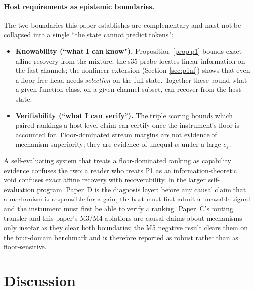 \documentclass[preprint,12pt]{elsarticle}
\begin{document}
\paragraph{Host requirements as epistemic boundaries.}
The two boundaries this paper establishes are complementary and must
not be collapsed into a single ``the state cannot predict tokens'':
\begin{itemize}
\item \textbf{Knowability (``what I can know'').}
  Proposition~\ref{prop:p1} bounds exact affine recovery from the
  mixture; the s35 probe locates linear information on the fast
  channels; the nonlinear extension (Section~\ref{sec:p1nl}) shows
  that even a floor-free head needs \emph{selection} on the full
  state. Together these bound what a given function class, on a given
  channel subset, can recover from the host state.
\item \textbf{Verifiability (``what I can verify'').}
  The triple scoring bounds which paired rankings a host-level claim
  can certify once the instrument's floor is accounted for.
  Floor-dominated stream margins are not evidence of mechanism
  superiority; they are evidence of unequal $\alpha$ under a large
  $c_\varepsilon$.
\end{itemize}
A self-evaluating system that treats a floor-dominated ranking as
capability evidence confuses the two; a reader who treats P1 as an
information-theoretic void confuses exact affine recovery with
recoverability. In the larger self-evaluation program, Paper~D is the
diagnosis layer: before any causal claim that a mechanism is
responsible for a gain, the host must first admit a knowable signal
and the instrument must first be able to verify a ranking. Paper~C's
routing transfer and this paper's M3/M4 ablations are causal claims
about mechanisms only insofar as they clear both boundaries; the M5
negative result clears them on the four-domain benchmark and is
therefore reported as robust rather than as floor-sensitive.

\section{Discussion}
\end{document}
